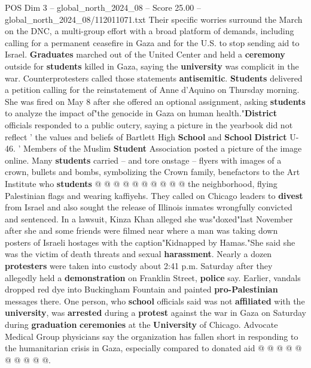 \begin{textsample}{POS Dim 3 – global\_north\_2024\_08 – Score 25.00 – global\_north\_2024\_08/112011071.txt}  \label{ex:f3_pos_131}
Their specific worries surround the March on the DNC, a multi-group effort with a broad platform of demands, including calling for a permanent ceasefire in Gaza and for the U.S. to stop sending aid to Israel. \textbf{Graduates} marched out of the United Center and held a \textbf{ceremony} outside for \textbf{students} killed in Gaza, saying the \textbf{university} was complicit in the war.
Counterprotesters called those statements \textbf{antisemitic}. \textbf{Students} delivered a petition calling for the reinstatement of Anne d'Aquino on Thursday morning.
She was fired on May 8 after she offered an optional assignment, asking \textbf{students} to analyze the impact of"the genocide in Gaza on human health."\textbf{District} officials responded to a public outcry, saying a picture in the yearbook did not reflect ' the values and beliefs of Bartlett High \textbf{School} and \textbf{School} \textbf{District} U-46. ' Members of the Muslim \textbf{Student} Association posted a picture of the image online.
Many \textbf{students} carried -- and tore onstage -- flyers with images of a crown, bullets and bombs, symbolizing the Crown family, benefactors to the Art Institute who \textbf{students} @ @ @ @ @ @ @ @ @ @ the neighborhood, flying Palestinian flags and wearing kaffiyehs.
They called on Chicago leaders to \textbf{divest} from Israel and also sought the release of Illinois inmates wrongfully convicted and sentenced.
In a lawsuit, Kinza Khan alleged she was"doxed"last November after she and some friends were filmed near where a man was taking down posters of Israeli hostages with the caption"Kidnapped by Hamas."She said she was the victim of death threats and sexual \textbf{harassment}.
Nearly a dozen \textbf{protesters} were taken into custody about 2:41 p.m.
Saturday after they allegedly held a \textbf{demonstration} on Franklin Street, \textbf{police} say.
Earlier, vandals dropped red dye into Buckingham Fountain and painted \textbf{pro-Palestinian} messages there.
One person, who \textbf{school} officials said was not \textbf{affiliated} with the \textbf{university}, was \textbf{arrested} during a \textbf{protest} against the war in Gaza on Saturday during \textbf{graduation} \textbf{ceremonies} at the \textbf{University} of Chicago.
Advocate Medical Group physicians say the organization has fallen short in responding to the humanitarian crisis in Gaza, especially compared to donated aid @ @ @ @ @ @ @ @ @ @.

\end{textsample}
